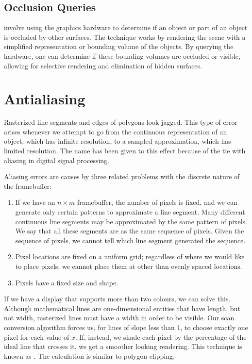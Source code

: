 \documentclass[../COS3712_Notes.tex]{subfiles}
\begin{document}
      \subsection{Occlusion Queries}
         involve using the graphics hardware to determine if an object
        or part of an object is occluded by other surfaces.
        The technique works by rendering the scene with a simplified representation or
        bounding volume of the objects.
        By querying the hardware, one can determine if these bounding volumes are occluded
        or visible, allowing for selective rendering and elimination of hidden surfaces.

    \pagebreak

    \section{Antialiasing}
      Rasterized line segments and edges of polygons look jagged.
      This type of error arises whenever we attempt to go from the continuous representation
      of an object, which has infinite resolution, to a sampled approximation,
      which has limited resolution.
      The name  has been given to this effect because of the tie
      with aliasing in digital signal processing.

      Aliasing errors are causes by three related problems with the discrete nature
      of the framebuffer:
      \begin{enumerate}[nosep]
        \item If we have an $n \times m$ framebuffer, the number of pixels is fixed,
          and we can generate only certain patterns to approximate a line segment.
          Many different continuous line segments may be approximated by the same pattern
          of pixels.
          We say that all these segments are  as the same sequence of pixels.
          Given the sequence of pixels, we cannot tell which line segment generated the sequence.
        \item Pixel locations are fixed on a uniform grid; regardless of where we would like
          to place pixels, we cannot place them at other than evenly spaced locations.
        \item Pixels have a fixed size and shape.
      \end{enumerate}

      If we have a display that supports more than two colours, we can solve this.
      Although mathematical lines are one-dimensional entities that have length, but not width,
      rasterized lines must have a width in order to be visible.
      Our scan conversion algorithm forces us, for lines of slope less than 1,
      to choose exactly one pixel for each value of $x$.
      If, instead, we shade each pixel by the percentage of the ideal line that crosses it,
      we get a smoother looking rendering.
      This technique is known as .
      The calculation is similar to polygon clipping.
\end{document}
